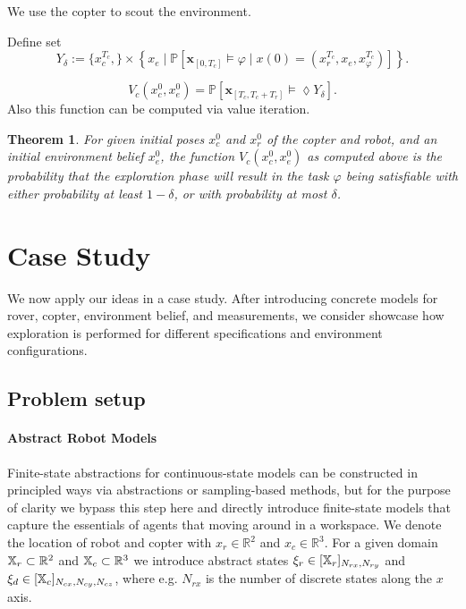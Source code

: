 \documentclass[conference]{IEEEtran}
\newtheorem{theorem}{Theorem}
\begin{document}
We use the copter to scout the environment.    

Define set 
 \[Y_\delta:=\{x^{T_c}_c,\}\times \left\{x_e \mid   \mathbb{P} \left[ \mathbf{x}_{[0, T_c]} \models\varphi \mid  x(0) = (x^{T_c}_r, x_e, x^{T_c}_\varphi)
\right]\right\}.\]
 
 
\begin{equation}
\label{eq:coptervalue}
	V_c(x^0_c, x^0_e) = \mathbb{P} \left[ \mathbf{x}_{[T_c, T_c+T_r]} \models \lozenge Y_\delta \right].
\end{equation}
Also this function can be computed via value iteration.

\begin{theorem}
	For given initial poses $x_c^0$ and $x_r^0$ of the copter and robot, and an initial environment belief $x_e^0$, the function $V_c(x_c^0, x_e^0)$ as computed above is the probability that the exploration phase will result in the task $\varphi$ being satisfiable with either probability at least $1- \delta$, or with probability at most $\delta$.  
\end{theorem}



\section{Case Study}
\label{sec:casestudy}

We now apply our ideas in a case study. After introducing concrete models for rover, copter, environment belief, and measurements, we consider showcase how exploration is performed for different specifications and environment configurations.

\subsection{Problem setup}

\paragraph{Abstract Robot Models}

Finite-state abstractions for continuous-state models can be constructed in principled ways via abstractions or sampling-based methods, but for the purpose of clarity we bypass this step here and directly introduce finite-state models that capture the essentials of agents that moving around in a workspace. We denote the location of robot and copter with $x_r \in \mathbb{R}^2$ and $x_c \in \mathbb{R}^3$. For a given domain $\mathbb{X}_r \subset \mathbb{R}^2$ and $\mathbb{X}_c \subset \mathbb{R}^3$ we introduce abstract states $\xi_r \in [\mathbb{X}_r]_{N_{rx}, N_{ry}}$ and $\xi_d \in [\mathbb{X}_c]_{N_{cx}, N_{cy}, N_{cz}}$, where e.g. $N_{rx}$ is the number of discrete states along the $x$ axis. 
\end{document}
